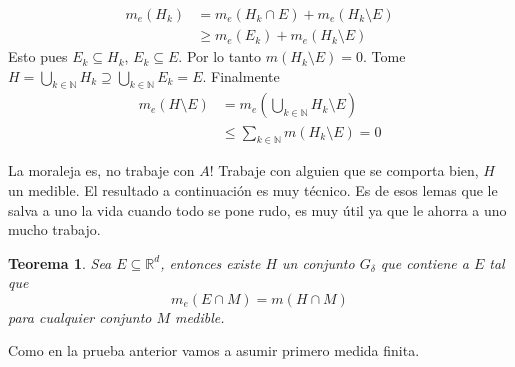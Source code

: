 \documentclass[12pt]{article}
\theoremstyle{plain}
\newtheorem{Th}{Teorema}[subsection]   %
\theoremstyle{definition}
\theoremstyle{remark}
\numberwithin{equation}{section}
\newcommand{\bN}{\mathbb{N}}        %
\newcommand{\bR}{\mathbb{R}}        %
\renewcommand{\geq}{\geqslant}      %
\renewcommand{\leq}{\leqslant}      %
\renewcommand{\:}{\colon}           %
\begin{document}
\begin{multicols}{2}
\begin{ptcbp}
\begin{align*}
  m_e(H_k) &=m_e(H_k\cap E)+m_e(H_k\setminus E)\\
  &\geq m_e(E_k)+m_e(H_k\setminus E)
\end{align*}
Esto pues $E_k\subseteq H_k$, $E_k\subseteq E$. Por lo tanto $m(H_k\setminus E)=0$. Tome $H=\bigcup_{k\in\bN}H_k\supseteq\bigcup_{k\in\bN}E_k=E$. Finalmente
\begin{align*}
  m_e(H\setminus E) & =m_e\left(\bigcup_{k\in\bN}H_k\setminus E\right)\\
  &\leq \sum_{k\in\bN}m(H_k\setminus E)=0
\end{align*}

\end{ptcbp}
La moraleja es, no trabaje con $A$! Trabaje con alguien que se comporta bien, $H$ un medible.
El resultado a continuación es muy técnico. Es de esos lemas que le salva a uno la vida cuando todo se pone rudo, es muy útil ya que le ahorra a uno mucho trabajo.
\begin{Th}
  Sea $E\subseteq\bR^d$, entonces existe $H$ un conjunto $G_\delta$ que contiene a $E$ tal que
  $$m_e(E\cap M)=m(H\cap M)$$
  para cualquier conjunto $M$ medible.
\end{Th}
Como en la prueba anterior vamos a asumir primero medida finita.


\end{multicols}
\end{document}
